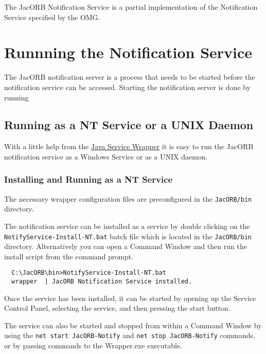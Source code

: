 %
%

The JacORB Notification Service is a partial implementation of
the Notification Service specified by the OMG.

\section{Runnning the Notification Service}
\label{sec:ntfy-running}

The JacORB notification server is a process that needs to be started
before the notification service can be accessed. Starting
the notification server is done by running



\subsection{Running as a NT Service or a UNIX Daemon}
\label{sec:runn-notif-serv-1}

With a little help from the
\href{http://wrapper.tanukisoftware.org}{Java Service Wrapper} it is
easy to run the JacORB notification service as a Windows Service or as
a UNIX daemon. 

\subsubsection{Installing and Running as a NT Service}
\label{sec:windows-service}

The necessary wrapper configuration files are preconfigured in the
\texttt{JacORB/bin} directory. 

The notification service can be installed as a service by double
clicking on the \texttt{NotifyService-Install-NT.bat} batch file which
is located in the \texttt{JacORB/bin} directory.
Alternatively you can open a Command Window and then run the install
script from the command prompt. 

\begin{verbatim}
  C:\JacORB\bin>NotifyService-Install-NT.bat
  wrapper  | JacORB Notification Service installed.
\end{verbatim}

Once the service has been installed, it can be started by opening up
the Service Control Panel, selecting the service, and then pressing
the start button.

The service can also be started and stopped from within a Command
Window by using the \texttt{net start JacORB-Notify} and \texttt{net
  stop JacORB-Notify} commands, or 
by passing commands to the Wrapper.exe executable. 

